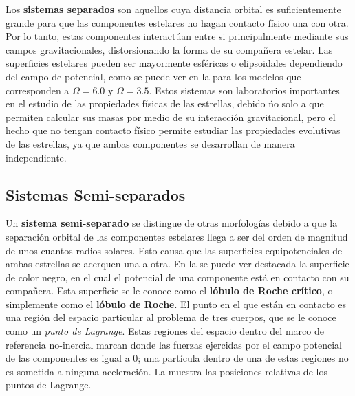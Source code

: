 Los \textbf{sistemas separados} son aquellos cuya distancia orbital es
suficientemente grande para que las componentes estelares no hagan contacto
físico una con otra. Por lo tanto, estas componentes interactúan entre si
principalmente mediante sus campos gravitacionales, distorsionando la forma de
su compañera estelar. Las superficies estelares pueden ser mayormente esféricas
o elipsoidales dependiendo del campo de potencial, como se puede ver en la
 para los modelos que corresponden a $\Omega =
6.0$ y $\Omega = 3.5$. Estos sistemas son laboratorios importantes en el estudio
de las propiedades físicas de las estrellas, debido ńo solo a que permiten
calcular sus masas por medio de su interacción gravitacional, pero el hecho que
no tengan contacto físico permite estudiar las propiedades evolutivas de las
estrellas, ya que ambas componentes se desarrollan de manera independiente.

\subsection{Sistemas Semi-separados}

Un \textbf{sistema semi-separado} se distingue de otras morfologías debido a que
la separación orbital de las componentes estelares llega a ser del orden de
magnitud de unos cuantos radios solares. Esto causa que las superficies
equipotenciales de ambas estrellas se acerquen una a otra. En la
 se puede ver destacada la superficie de color
negro, en el cual el potencial de una componente está en contacto con su
compañera. Esta superficie se le conoce como el \textbf{lóbulo de Roche
crítico}, o simplemente como el \textbf{lóbulo de Roche}. El punto en el que
están en contacto es una región del espacio particular al problema de tres
cuerpos, que se le conoce como un \textit{punto de Lagrange}. Estas regiones del
espacio dentro del marco de referencia no-inercial marcan donde las fuerzas
ejercidas por el campo potencial de las componentes es igual a 0; una partícula
dentro de una de estas regiones no es sometida a ninguna aceleración. La
 muestra las posiciones relativas de los puntos de
Lagrange.

